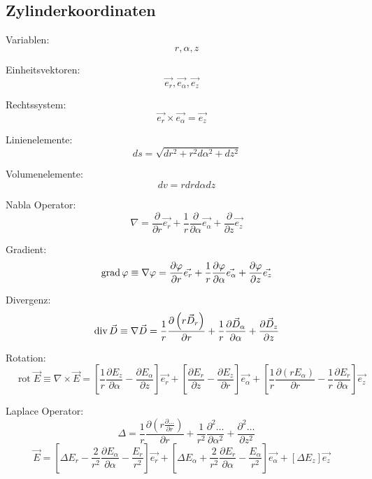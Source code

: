 \subsection{Zylinderkoordinaten}
\begin{description}
    \item Variablen:
          \[
              \quad r, \alpha, z
          \]
    \item Einheitsvektoren:
          \[
              \quad \vec{e_{r}}, \vec{e_{\alpha}}, \vec{e_{z}} \quad
          \]
    \item Rechtssystem:
          \[
              \vec{e_{r}} \times \vec{e_{\alpha}}=\vec{e_{z}}
          \]
    \item Linienelemente:
          \[
              \quad d s=\sqrt{d r^{2}+r^{2} d \alpha^{2}+d z^{2}}
          \]
    \item Volumenelemente:
          \[
              \quad d v=r d r d \alpha d z
          \]
    \item Nabla Operator:
          \[
              \quad \nabla=\frac{\partial}{\partial r} \vec{e_{r}}+\frac{1}{r} \frac{\partial}{\partial \alpha} \vec{e_{\alpha}}+\frac{\partial}{\partial z} \vec{e_{z}}
          \]
    \item Gradient:
          \[
              \quad \operatorname{grad} \varphi \equiv \nabla \varphi=\frac{\partial \varphi}{\partial r} \vec{e_{r}}+\frac{1}{r} \frac{\partial \varphi}{\partial \alpha} \vec{e_{\alpha}}+\frac{\partial \varphi}{\partial z} \vec{e_{z}}
          \]
    \item Divergenz:
          \[
              \quad \operatorname{div} \vec{D} \equiv \nabla \vec{D}=\frac{1}{r} \frac{\partial\left(r \vec{D}_{r}\right)}{\partial r}+\frac{1}{r} \frac{\partial \vec{D}_{\alpha}}{\partial \alpha}+\frac{\partial \vec{D}_{z}}{\partial z}
          \]
    \item Rotation:
          \[
              \quad \operatorname{rot} \vec{E} \equiv \nabla \times \vec{E}=\left[\frac{1}{r} \frac{\partial E_{z}}{\partial \alpha}-\frac{\partial E_{\alpha}}{\partial z}\right] \vec{e_{r}}+\left[\frac{\partial E_{r}}{\partial z}-\frac{\partial E_{z}}{\partial r}\right] \vec{e_{\alpha}}+\left[\frac{1}{r} \frac{\partial\left(r E_{\alpha}\right)}{\partial r}-\frac{1}{r} \frac{\partial E_{r}}{\partial \alpha}\right] \vec{e_{z}}
          \]
    \item Laplace Operator:
          \[
              \quad \Delta = \frac{1}{r}\frac{\partial \left(r \frac{\partial \ldots}{\partial r}\right)}{\partial r} + \frac{1}{r^2}\frac{\partial^2 \ldots}{\partial \alpha^2} + \frac{\partial^2 \ldots}{\partial z^2}
          \]
          \[
              \vec{E} =  \left[\Delta E_{r}-\frac{2}{r^{2}} \frac{\partial E_{\alpha}}{\partial \alpha}-\frac{E_{r}}{r^{2}}\right] \vec{e_{r}}
               +\left[\Delta E_{\alpha}+\frac{2}{r^{2}} \frac{\partial E_{r}}{\partial \alpha}-\frac{E_{\alpha}}{r^{2}}\right] \vec{e_{\alpha}}+\left[\Delta E_{z}\right] \vec{e_{z}}
          \]
\end{description}

